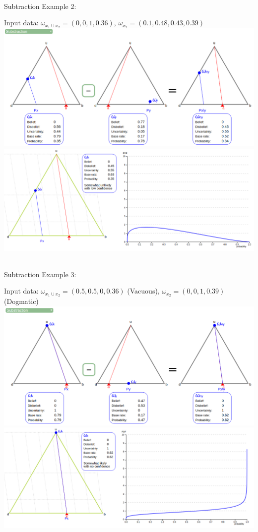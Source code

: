 \documentclass[UTF8]{article}
\newcommand{\opinion}[5]{$\omega_{#1} = (#2, #3, #4, #5)$}
\begin{document}
\hrulefill\\
Subtraction Example 2:
    \begin{center}
        Input data: 
        \opinion{x_1 \cup x_2}{0}{0}{1}{0.36}, 
        \opinion{x_2}{0.1}{0.48}{0.43}{0.39}\\
        \includegraphics[width=6in]{images/sub2.png}
        \includegraphics[width=6in]{images/sub2viz.png}
    \end{center}
    \hrulefill\\
Subtraction Example 3:
    \begin{center}
        Input data: 
        \opinion{x_1 \cup x_2}{0.5}{0.5}{0}{0.36} (Vacuous), 
        \opinion{x_2}{0}{0}{1}{0.39} (Dogmatic)\\
        \includegraphics[width=6in]{images/sub3.png}
        \includegraphics[width=6in]{images/sub3viz.png}
\end{center}
\end{document}
